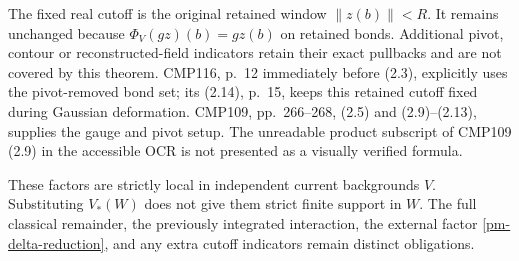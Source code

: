 The fixed real cutoff is the original retained window
$\|z(b)\|<R$. It remains unchanged because
$\Phi_V(gz)(b)=gz(b)$ on retained bonds. Additional pivot,
contour or reconstructed-field indicators retain their exact
pullbacks and are not covered by this theorem. CMP116,
p.~12 immediately before (2.3), explicitly uses the
pivot-removed bond set; its (2.14), p.~15, keeps this retained
cutoff fixed during Gaussian deformation. CMP109,
pp.~266--268, (2.5) and (2.9)--(2.13), supplies the gauge
and pivot setup. The unreadable product subscript of
CMP109 (2.9) in the accessible OCR is not presented as a
visually verified formula.

These factors are strictly local in independent current
backgrounds $V$. Substituting $V_*(W)$ does not give them
strict finite support in $W$. The full classical remainder,
the previously integrated interaction, the external factor
\eqref{pm-delta-reduction}, and any extra cutoff indicators
remain distinct obligations.

